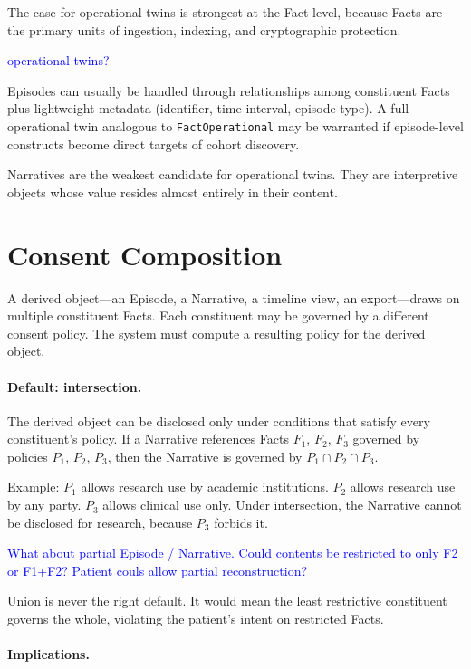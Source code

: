 \documentclass[11pt]{article}
\begin{document}
The case for operational twins is strongest at the Fact level, because
Facts are the primary units of ingestion, indexing, and cryptographic
protection.

\textcolor{blue}{operational twins?}

Episodes can usually be handled through relationships among constituent
Facts plus lightweight metadata (identifier, time interval, episode
type). A full operational twin analogous to \texttt{FactOperational} may
be warranted if episode-level constructs become direct targets of cohort
discovery.

Narratives are the weakest candidate for operational twins. They are
interpretive objects whose value resides almost entirely in their
content.

\section{Consent Composition}
\label{sec:consent-composition}

A derived object---an Episode, a Narrative, a timeline view, an
export---draws on multiple constituent Facts. Each constituent may be
governed by a different consent policy. The system must compute a
resulting policy for the derived object.

\paragraph{Default: intersection.}
The derived object can be disclosed only under conditions that satisfy
every constituent's policy. If a Narrative references Facts $F_1$, $F_2$,
$F_3$ governed by policies $P_1$, $P_2$, $P_3$, then the Narrative is
governed by $P_1 \cap P_2 \cap P_3$.

Example: $P_1$ allows research use by academic institutions. $P_2$
allows research use by any party. $P_3$ allows clinical use only. Under
intersection, the Narrative cannot be disclosed for research, because
$P_3$ forbids it.

\textcolor{blue}{What about partial Episode / Narrative. Could contents be restricted to only F2 or F1+F2? Patient couls allow partial reconstruction?}

Union is never the right default. It would mean the least restrictive
constituent governs the whole, violating the patient's intent on
restricted Facts.

\paragraph{Implications.}
\end{document}

